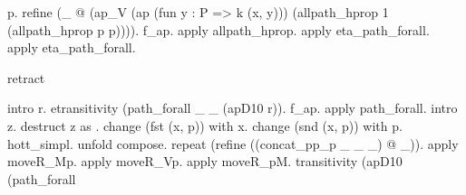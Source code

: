 \begin{coqdoccode}
\begin{coqdoccomment}
p.\coqdoceol
\coqdocindent{1.00em}
refine\coqdocindent{0.50em}
(\_\coqdocindent{0.50em}
@\coqdocindent{0.50em}
(ap\_V\coqdocindent{0.50em}
(ap\coqdocindent{0.50em}
(fun\coqdocindent{0.50em}
y\coqdocindent{0.50em}
:\coqdocindent{0.50em}
P\coqdocindent{0.50em}
=>\coqdocindent{0.50em}
k\coqdocindent{0.50em}
(x,\coqdocindent{0.50em}
y)))\coqdocindent{0.50em}
\coqdoceol
\coqdocindent{10.00em}
(allpath\_hprop\coqdocindent{0.50em}
1\coqdocindent{0.50em}
(allpath\_hprop\coqdocindent{0.50em}
p\coqdocindent{0.50em}
p)))).\coqdoceol
\coqdocindent{1.00em}
f\_ap.\coqdocindent{0.50em}
apply\coqdocindent{0.50em}
allpath\_hprop.\coqdoceol
\coqdocindent{1.00em}
\coqdoceol
\coqdocindent{1.00em}
apply\coqdocindent{0.50em}
eta\_path\_forall.\coqdoceol
\coqdocindent{1.00em}
apply\coqdocindent{0.50em}
eta\_path\_forall.\coqdoceol
\coqdocindent{1.00em}
\coqdoceol
\coqdoceol
\coqdocindent{1.00em}
\begin{coqdoccomment}
\coqdocindent{0.50em}
retract\coqdocindent{0.50em}
\end{coqdoccomment}
\coqdoceol
\coqdocindent{1.00em}
intro\coqdocindent{0.50em}
r.\coqdoceol
\coqdocindent{1.00em}
etransitivity\coqdocindent{0.50em}
(path\_forall\coqdocindent{0.50em}
\_\coqdocindent{0.50em}
\_\coqdocindent{0.50em}
(apD10\coqdocindent{0.50em}
r)).\coqdoceol
\coqdocindent{1.00em}
f\_ap.\coqdocindent{0.50em}
apply\coqdocindent{0.50em}
path\_forall.\coqdocindent{0.50em}
intro\coqdocindent{0.50em}
z.\coqdoceol
\coqdocindent{1.00em}
destruct\coqdocindent{0.50em}
z\coqdocindent{0.50em}
as\coqdocindent{0.50em}
 .\coqdoceol
\coqdocindent{1.00em}
change\coqdocindent{0.50em}
(fst\coqdocindent{0.50em}
(x,\coqdocindent{0.50em}
p))\coqdocindent{0.50em}
with\coqdocindent{0.50em}
x.\coqdocindent{0.50em}
change\coqdocindent{0.50em}
(snd\coqdocindent{0.50em}
(x,\coqdocindent{0.50em}
p))\coqdocindent{0.50em}
with\coqdocindent{0.50em}
p.\coqdoceol
\coqdocindent{1.00em}
hott\_simpl.\coqdoceol
\coqdoceol
\coqdoceol
\coqdocindent{1.00em}
unfold\coqdocindent{0.50em}
compose.\coqdoceol
\coqdocindent{1.00em}
repeat\coqdocindent{0.50em}
(refine\coqdocindent{0.50em}
((concat\_pp\_p\coqdocindent{0.50em}
\_\coqdocindent{0.50em}
\_\coqdocindent{0.50em}
\_)\coqdocindent{0.50em}
@\coqdocindent{0.50em}
\_)).\coqdoceol
\coqdocindent{1.00em}
apply\coqdocindent{0.50em}
moveR\_Mp.\coqdocindent{0.50em}
apply\coqdocindent{0.50em}
moveR\_Vp.\coqdocindent{0.50em}
apply\coqdocindent{0.50em}
moveR\_pM.\coqdoceol
\coqdocindent{1.00em}
transitivity\coqdocindent{0.50em}
(apD10\coqdoceol
\coqdocindent{6.00em}
(path\_forall\coqdoceol
\coqdocindent{7.00em}

\end{coqdoccomment}
\end{coqdoccode}
